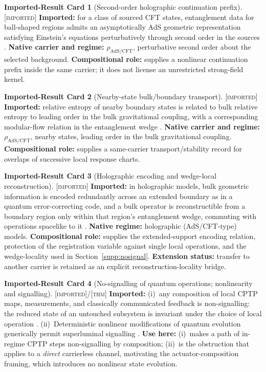 \documentclass[11pt]{article}
\newcommand{\Thm}{\textsc{[thm]}}
\newcommand{\Imp}{\textsc{[imported]}}
\theoremstyle{definition}
\newtheorem{scard}{Imported-Result Card}
\begin{document}
\begin{scard}[Second-order holographic continuation prefix]
\label{card:faulkner-nonlinear}
\Imp{} \textbf{Imported:} for a class of sourced CFT states, entanglement data for
ball-shaped regions admits an asymptotically AdS geometric representation satisfying
Einstein's equations perturbatively through second order in the sources
\cite{S_FaulknerEtAl2017}. \textbf{Native carrier and regime:}
$\rho_{\mathrm{AdS/CFT}}$, perturbative second order about the selected background.
\textbf{Compositional role:} supplies a nonlinear continuation prefix inside the
same carrier; it does not license an unrestricted strong-field kernel.
\end{scard}

\begin{scard}[Nearby-state bulk/boundary transport]
\label{card:jlms}
\Imp{} \textbf{Imported:} relative entropy of nearby boundary states is related to
bulk relative entropy to leading order in the bulk gravitational coupling, with a
corresponding modular-flow relation in the entanglement wedge
\cite{S_JafferisEtAl2016}. \textbf{Native carrier and regime:}
$\rho_{\mathrm{AdS/CFT}}$, nearby states, leading order in the bulk gravitational
coupling. \textbf{Compositional role:} supplies a same-carrier transport/stability
record for overlaps of successive local response charts.
\end{scard}

\begin{scard}[Holographic encoding and wedge-local reconstruction]\label{card:qec}
\Imp{} \textbf{Imported:} in holographic models, bulk geometric information is
encoded redundantly across an extended boundary as in a quantum error-correcting
code, and a bulk operator is reconstructible from a boundary region only within
that region's entanglement wedge, commuting with operations spacelike to it
\cite{S_AlmheiriDongHarlow2015, S_PastawskiEtAl2015, S_DongHarlowWall2016}.
\textbf{Native regime:} holographic (AdS/CFT-type) models. \textbf{Compositional
role:} supplies the extended-support encoding relation, protection of the
registration variable against single local operations, and the wedge-locality used
in Section~\ref{supp:nosignal}. \textbf{Extension status:} transfer to another
carrier is retained as an explicit reconstruction-locality bridge.
\end{scard}

\begin{scard}[No-signalling of quantum operations; nonlinearity and signalling]\label{card:nosig}
\Imp{}/\Thm{} \textbf{Imported:} (i)~any composition of local CPTP maps,
measurements, and classically communicated feedback is non-signalling: the reduced
state of an untouched subsystem is invariant under the choice of local operation
\cite{S_NielsenChuang2010}. (ii)~Deterministic nonlinear modifications of quantum
evolution generically permit superluminal signalling \cite{S_Gisin1990,
S_Polchinski1991}. \textbf{Use here:} (i)~makes a path of in-regime CPTP steps
non-signalling by composition; (ii)~is the obstruction that applies to a
\emph{direct} carrierless channel, motivating the actuator-composition framing,
which introduces no nonlinear state evolution.
\end{scard}
\end{document}
